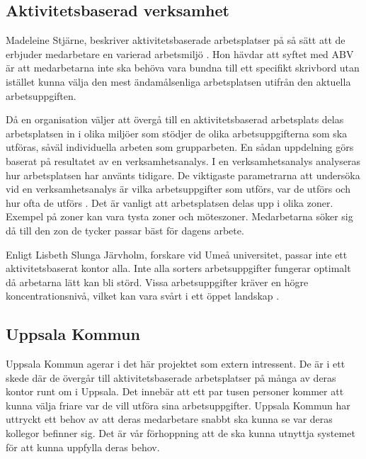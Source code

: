 \documentclass[swedish, a4paper,12pt]{article}
\begin{document}
\subsection{Aktivitetsbaserad verksamhet}
Madeleine Stjärne, beskriver aktivitetsbaserade arbetsplatser på så sätt att de erbjuder medarbetare en varierad arbetsmiljö \cite{ABV}. Hon hävdar att syftet med ABV är att medarbetarna inte ska behöva vara bundna till ett specifikt skrivbord utan istället kunna välja den mest ändamålsenliga arbetsplatsen utifrån den aktuella arbetsuppgiften. %

Då en organisation väljer att övergå till en aktivitetsbaserad arbetsplats
delas arbetsplatsen in i olika miljöer som stödjer de olika arbetsuppgifterna som ska utföras, såväl individuella arbeten som grupparbeten. En sådan uppdelning görs baserat på resultatet av en verksamhetsanalys. I en verksamhetsanalys analyseras hur arbetsplatsen har använts tidigare. De viktigaste parametrarna att undersöka vid en verksamhetsanalys är vilka arbetsuppgifter som utförs, var de utförs och hur ofta de utförs \cite{ABV}.
Det är vanligt att arbetsplatsen delas upp i olika zoner. Exempel på zoner kan vara tysta zoner och möteszoner. Medarbetarna söker sig då till den zon de tycker passar bäst för dagens arbete.

Enligt Lisbeth Slunga Järvholm, forskare vid Umeå universitet, passar inte ett aktivitetsbaserat kontor alla. Inte alla sorters arbetsuppgifter fungerar optimalt då arbetarna lätt kan bli störd. Vissa arbetsuppgifter kräver en högre koncentrationsnivå, vilket kan vara svårt i ett öppet landskap \cite{passarInteAlla}.

\subsection{Uppsala Kommun}
Uppsala Kommun agerar i det här projektet som extern intressent. De är i ett skede där de övergår till aktivitetsbaserade arbetsplatser på många av deras kontor runt om i Uppsala. Det innebär att %
ett par tusen personer kommer att kunna välja friare var de vill utföra sina arbetsuppgifter. Uppsala Kommun har uttryckt ett behov av att deras medarbetare snabbt ska kunna se var deras kollegor befinner sig. Det är vår förhoppning att de ska kunna utnyttja systemet för att kunna uppfylla deras behov.
\end{document}
